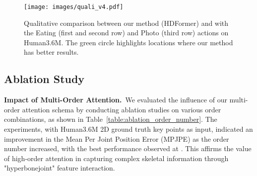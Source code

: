 \documentclass{article}
\begin{document}
\begin{figure}[!t]
    \centering
    \texttt{[image: images/quali\_v4.pdf]}
    \vspace{-10mm}
    \caption{\small Qualitative comparison between our method (HDFormer) and \protect\cite{ZhangCVPR22MixSTE} with the Eating (first and second row) and Photo (third row) actions on Human3.6M. The green circle highlights locations where our method has better results.}
    \vspace{2mm}
    \label{fig:vis_compare}
\end{figure}


\subsection{Ablation Study}

\noindent \textbf{Impact of Multi-Order Attention.}~We evaluated the influence of our multi-order attention schema by conducting ablation studies on various order combinations, as shown in Table~\ref{table:ablation_order_number}. The experiments, with Human3.6M 2D ground truth key points as input, indicated an improvement in the Mean Per Joint Position Error (MPJPE) as the order number increased, with the best performance observed at . This affirms the value of high-order attention in capturing complex skeletal information through "hyperbonejoint" feature interaction.

\begin{table}
    \centering
    \scriptsize
    \caption{\small Ablation study of the order number. We compared the results of different orders involved in the high-order attention transformer block in Human3.6M with ground truth as input.}
    \vspace{-0.1in}
    \label{table:ablation_order_number}
    \vspace{-4mm}
\end{table}
\end{document}
